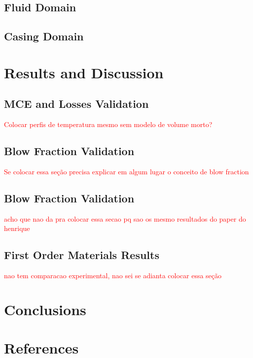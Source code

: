 \documentclass[review,preprint,12pt]{elsarticle}
\begin{document}
\subsection{Fluid Domain}

\subsection{Casing Domain}



\section{Results and Discussion}

\subsection{MCE and Losses Validation}

\textcolor{red}{Colocar perfis de temperatura mesmo sem modelo de volume morto?}

\subsection{Blow Fraction Validation}

\textcolor{red}{Se colocar essa seção precisa explicar em algum lugar o conceito de blow fraction}



\subsection{Blow Fraction Validation}

\textcolor{red}{acho que nao da pra colocar essa secao pq sao os mesmo resultados do paper do henrique}


\subsection{First Order Materials Results}

\textcolor{red}{nao tem comparacao experimental, nao sei se adianta colocar essa seção}

\section{Conclusions}


\section*{References}





\end{document}
